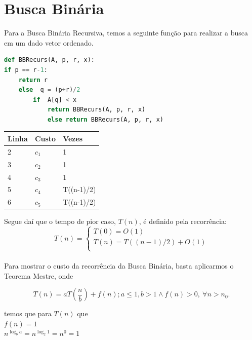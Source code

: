 \documentclass[a4paper, 12pt]{article}
\begin{document}
\section{Busca Binária}

Para a Busca Binária Recursiva, temos a seguinte função para realizar a busca em um dado vetor ordenado.

\begin{lstlisting}[language=Python, caption= Código da função da Busca Binária]
def BBRecurs(A, p, r, x):
if p == r-1:
	return r
	else  q = (p+r)/2
		if  A[q] < x
			return BBRecurs(A, p, r, x)
			else return BBRecurs(A, p, r, x)

\end{lstlisting}

\begin{center}
\begin{tabular}{|l|l|l|}
\hline
{\bf Linha} & {\bf Custo} & {\bf Vezes}\\
\hline
2 & $c_1$ & 1\\
\hline
3 & $c_2$ & 1\\
\hline
4 & $c_3$ & 1\\
\hline
5 & $c_4$ & T((n-1)/2)\\
\hline
6 & $c_5$ & T((n-1)/2)\\
\hline
\end{tabular}
\end{center}

Segue daí que o tempo de pior caso, $T(n)$, é definido pela recorrência:
\begin{equation}
T(n) = \left\{ \begin{array}{l}
T(0)=O(1) \\
T(n)=T((n-1)/2)+O(1)\\
\end{array}
\right.
\end{equation} \\

Para mostrar o custo da recorrência da Busca Binária, basta aplicarmos o Teorema Mestre, onde

\begin{equation}
T(n)= aT(\frac{n}{b})+f(n); a\leq1, b>1 \wedge f(n) > 0, \ \forall n>n_0.
\end{equation}

temos que para $T(n)$ que\\

$f(n)=1$\\
$n^{\log_b a} = n^{\log_2 1} = n^0 = 1$\\
\end{document}
